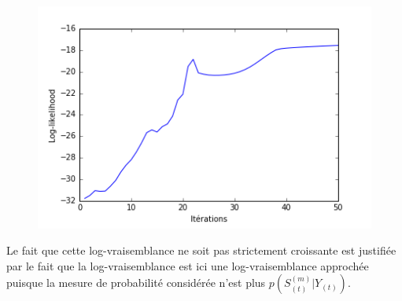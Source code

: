 \documentclass[10pt,a4paper]{article}
\begin{document}
\begin{figure}[H]
\centering
\includegraphics[scale=0.5]{../resources/pictures/M3_K2_meanfield.png}
\end{figure}

Le fait que cette log-vraisemblance ne soit pas strictement croissante est 
justifiée par le fait que la log-vraisemblance est ici une log-vraisemblance 
approchée puisque la mesure de probabilité considérée n'est plus 
$p(S_{(t)}^{(m)} \vert Y_{(t)})$.

\label{results}
  
  
\end{document}
